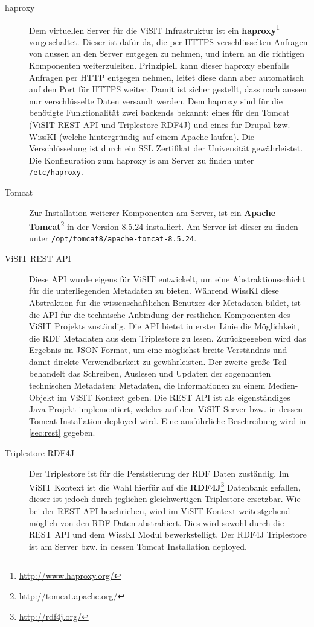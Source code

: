\begin{description}
	\item[haproxy] Dem virtuellen Server für die ViSIT Infrastruktur ist ein \textbf{haproxy}\footnote{\url{http://www.haproxy.org/}} vorgeschaltet. Dieser ist dafür da, die per HTTPS verschlüsselten Anfragen von aussen an den Server entgegen zu nehmen, und intern an die richtigen Komponenten weiterzuleiten. Prinzipiell kann dieser haproxy ebenfalls Anfragen per HTTP entgegen nehmen, leitet diese dann aber automatisch auf den Port für HTTPS weiter. Damit ist sicher gestellt, dass nach aussen nur verschlüsselte Daten versandt werden. Dem haproxy sind für die benötigte Funktionalität zwei backends bekannt: eines für den Tomcat (ViSIT REST API und Triplestore RDF4J) und eines für Drupal bzw. WissKI (welche hintergründig auf einem Apache laufen). Die Verschlüsselung ist durch ein SSL Zertifikat der Universität gewährleistet. Die Konfiguration zum haproxy is am Server zu finden unter \texttt{/etc/haproxy}.
	\item[Tomcat] Zur Installation weiterer Komponenten am Server, ist ein \textbf{Apache Tomcat}\footnote{\url{http://tomcat.apache.org/}} in der Version 8.5.24 installiert. Am Server ist dieser zu finden unter \texttt{/opt/tomcat8/apache-tomcat-8.5.24}.
	\item[ViSIT REST API] Diese API wurde eigens für ViSIT entwickelt, um eine Abstraktionsschicht für die unterliegenden Metadaten zu bieten. Während WissKI diese Abstraktion für die wissenschaftlichen Benutzer der Metadaten bildet, ist die API für die technische Anbindung der restlichen Komponenten des ViSIT Projekts zuständig. Die API bietet in erster Linie die Möglichkeit, die RDF Metadaten aus dem Triplestore zu lesen. Zurückgegeben wird das Ergebnis im JSON Format, um eine möglichst breite Verständnis und damit direkte Verwendbarkeit zu gewährleisten. Der zweite große Teil behandelt das Schreiben, Auslesen und Updaten der sogenannten technischen Metadaten: Metadaten, die Informationen zu einem Medien-Objekt im ViSIT Kontext geben. Die REST API ist als eigenständiges Java-Projekt implementiert, welches auf dem ViSIT Server bzw. in dessen Tomcat Installation deployed wird. Eine ausführliche Beschreibung wird in \autoref{sec:rest} gegeben.
	\item[Triplestore RDF4J] Der Triplestore ist für die Persistierung der RDF Daten zuständig. Im ViSIT Kontext ist die Wahl hierfür auf die \textbf{RDF4J}\footnote{\url{http://rdf4j.org/}} Datenbank gefallen, dieser ist jedoch durch jeglichen gleichwertigen Triplestore ersetzbar. Wie bei der REST API beschrieben, wird im ViSIT Kontext weitestgehend möglich von den RDF Daten abstrahiert. Dies wird sowohl durch die REST API und dem WissKI Modul bewerkstelligt. Der RDF4J Triplestore ist am Server bzw. in dessen Tomcat Installation deployed.

\end{description}
